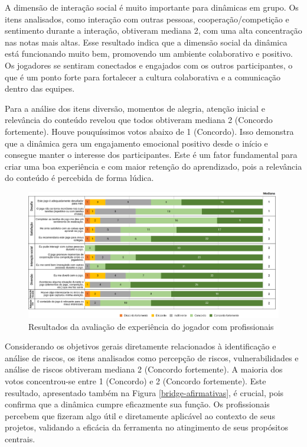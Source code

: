 \documentclass[
	12pt,
	openright,
	twoside,
	a4paper,
	english,
	brazil
	]{abntex2}
\begin{document}
A dimensão de interação social é muito importante para dinâmicas em grupo. Os itens analisados, como interação com outras pessoas, cooperação/competição e sentimento durante a interação, obtiveram mediana 2, com uma alta concentração nas notas mais altas. Esse resultado indica que a dimensão social da dinâmica está funcionando muito bem, promovendo um ambiente colaborativo e positivo. Os jogadores se sentiram conectados e engajados com os outros participantes, o que é um ponto forte para fortalecer a cultura colaborativa e a comunicação dentro das equipes.

Para a análise dos itens diversão, momentos de alegria, atenção inicial e relevância do conteúdo revelou que todos obtiveram mediana 2 (Concordo fortemente). Houve pouquíssimos votos abaixo de 1 (Concordo). Isso demonstra que a dinâmica gera um engajamento emocional positivo desde o início e consegue manter o interesse dos participantes. Este é um fator fundamental para criar uma boa experiência e com maior retenção do aprendizado, pois a relevância do conteúdo é percebida de forma lúdica.

\begin{figure}[H]
	\caption{\label{bridge-xp-jogador} Resultados da avaliação de experiência do jogador com profissionais}
  \includegraphics[width=\textwidth]{bridge-xp-jogador}
\end{figure}


Considerando os objetivos gerais diretamente relacionados à identificação e análise de riscos, os itens analisados como percepção de riscos, vulnerabilidades e análise de riscos obtiveram mediana 2 (Concordo fortemente). A maioria dos votos concentrou-se entre 1 (Concordo) e 2 (Concordo fortemente). Este resultado, apresentado também na Figura \ref{bridge-afirmativas}, é crucial, pois confirma que a dinâmica cumpre eficazmente sua função. Os profissionais percebem que fizeram algo útil e diretamente aplicável ao contexto de seus projetos, validando a eficácia da ferramenta no atingimento de seus propósitos centrais.
\end{document}
